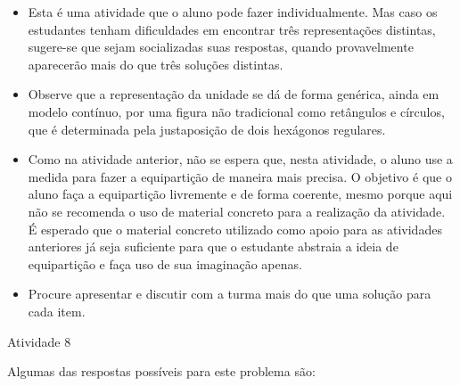 \begin{multicols}{2}
   \vspace{.1cm}

\begin{itemize} %
   \item Esta é uma atividade que o aluno pode fazer individualmente. Mas caso os estudantes tenham dificuldades em encontrar três representações distintas, sugere-se que sejam socializadas suas respostas, quando provavelmente aparecerão mais do que três soluções distintas.
   \item Observe que a representação da unidade se dá de forma genérica, ainda em modelo contínuo, por uma figura não tradicional como retângulos e círculos, que é determinada pela justaposição de dois hexágonos regulares.
   \item       Como na atividade anterior, não se espera que, nesta atividade, o aluno use a medida para fazer a equipartição de maneira mais precisa. O objetivo é que o aluno faça a equipartição livremente e de forma coerente,  mesmo porque aqui não se recomenda o uso de material concreto para a realização da atividade. É esperado que o material concreto utilizado como apoio para as atividades anteriores já seja suficiente para que o estudante abstraia a ideia de equipartição e faça uso de sua imaginação apenas.
   \item Procure apresentar e discutir com a turma mais do que uma solução para cada item.
\end{itemize} %

\begin{resposta*}{Atividade 8}

Algumas das respostas possíveis para este problema são:
\begin{center}
\hspace{.2cm}


\end{center}
\end{resposta*}
\end{multicols}
